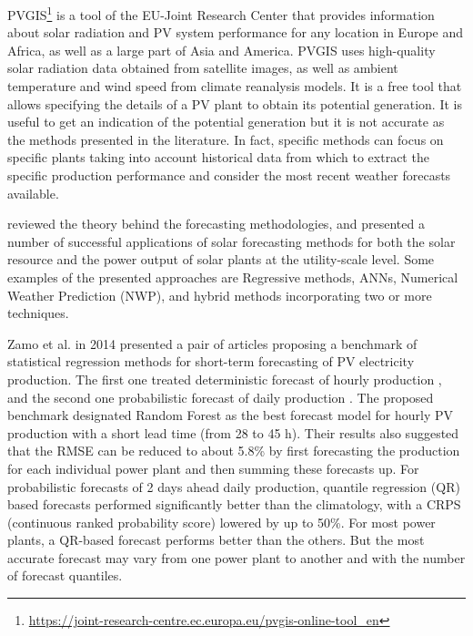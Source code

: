 PVGIS\footnote{ \url{https://joint-research-centre.ec.europa.eu/pvgis-online-tool_en} } is a tool of the EU-Joint Research Center that provides information about solar radiation and PV system performance for any location in Europe and Africa, as well as a large part of Asia and America.
PVGIS uses high-quality solar radiation data obtained from satellite images, as well as ambient temperature and wind speed from climate reanalysis models.
It is a free tool that allows specifying the details of a PV plant to obtain its potential generation.
It is useful to get an indication of the potential generation but it is not accurate as the methods presented in the literature.
In fact, specific methods can focus on specific plants taking into account historical data from which to extract the specific production performance and consider the most recent weather forecasts available.

\cite{INMAN2013535} reviewed the theory behind the forecasting methodologies, and presented a number of successful applications of solar forecasting methods for both the solar resource and the power output of solar plants at the utility-scale level.
Some examples of the presented approaches are Regressive methods, ANNs, Numerical Weather Prediction (NWP), and hybrid methods incorporating two or more techniques.

Zamo et al. in 2014 presented a pair of articles proposing a benchmark of statistical regression methods for short-term forecasting of PV electricity production.
The first one treated deterministic forecast of hourly production \cite{ZAMO2014792}, and the second one probabilistic forecast of daily production \cite{ZAMO2014804}.
The proposed benchmark designated Random Forest as the best forecast model for hourly PV production with a short lead time (from 28 to 45 h).
Their results also suggested that the RMSE can be reduced to about 5.8\% by first forecasting the production for each individual power plant and then summing these forecasts up.
For probabilistic forecasts of 2 days ahead daily production, quantile regression (QR) based forecasts performed significantly better than the climatology, with a CRPS (continuous ranked probability score) lowered by up to 50\%.
For most power plants, a QR-based forecast performs better than the others.
But the most accurate forecast may vary from one power plant to another and with the number of forecast quantiles.

